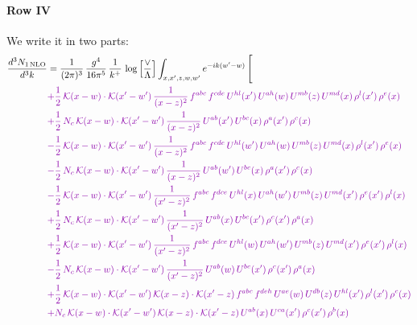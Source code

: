 \documentclass[10pt]{article}
\numberwithin{equation}{section}
\begin{document}
\paragraph{Row IV}
We write it in two parts: 
\begin{align}
\frac{d^{3}N_{1\,\mathrm{NLO}}}{d^{3}k} & = \frac{1}{(2\pi)^{3}}\,\frac{g^{4}}{16\pi^{5}}\,\frac{1}{k^{+}}\,\log\Big[\frac{\vee}{\Lambda}\Big]\int_{x,x',z,w,w'}e^{-ik(w'-w)}\,\Bigg[\notag\\ &{\color{CC} 
 +\frac{1}{2}\,\mathcal{K}(x-w)\cdot\mathcal{K}(x'-w')\,\frac{1}{(x-z)^{2}}\,f^{abc}\,f^{cde}\,U^{hl}(x')\,U^{ah}(w)\,U^{mb}(z)\,U^{md}(x)\,\rho^{l}(x')\,\rho^{e}(x)} \notag\\
&{\color{CC} +\frac{1}{2}\,N_{c}\,\mathcal{K}(x-w)\cdot\mathcal{K}(x'-w')\,\frac{1}{(x-z)^{2}}\,U^{ab}(x')\,U^{bc}(x)\,\rho^{a}(x')\,\rho^{c}(x)} \notag\\
&{\color{CC} -\frac{1}{2}\,\mathcal{K}(x-w)\cdot\mathcal{K}(x'-w')\,\frac{1}{(x-z)^{2}}\,f^{abc}\,f^{cde}\,U^{hl}(w')\,U^{ah}(w)\,U^{mb}(z)\,U^{md}(x)\,\rho^{l}(x')\,\rho^{e}(x)} \notag\\
&{\color{CC} -\frac{1}{2}\,N_{c}\,\mathcal{K}(x-w)\cdot\mathcal{K}(x'-w')\,\frac{1}{(x-z)^{2}}\,U^{ab}(w')\,U^{bc}(x)\,\rho^{a}(x')\,\rho^{c}(x)} \notag\\
&{\color{CC} -\frac{1}{2}\,\mathcal{K}(x-w)\cdot\mathcal{K}(x'-w')\,\frac{1}{(x'-z)^{2}}\,f^{abc}\,f^{dce}\,U^{hl}(x)\,U^{ah}(w')\,U^{mb}(z)\,U^{md}(x')\,\rho^{e}(x')\,\rho^{l}(x)} \notag\\
&{\color{CC} +\frac{1}{2}\,N_{c}\,\mathcal{K}(x-w)\cdot\mathcal{K}(x'-w')\,\frac{1}{(x'-z)^{2}}\,U^{ab}(x)\,U^{bc}(x')\,\rho^{c}(x')\,\rho^{a}(x)} \notag\\
&{\color{CC} +\frac{1}{2}\,\mathcal{K}(x-w)\cdot\mathcal{K}(x'-w')\,\frac{1}{(x'-z)^{2}}\,f^{abc}\,f^{dce}\,U^{hl}(w)\,U^{ah}(w')\,U^{mb}(z)\,U^{md}(x')\,\rho^{e}(x')\,\rho^{l}(x)} \notag\\
&{\color{CC} -\frac{1}{2}\,N_{c}\,\mathcal{K}(x-w)\cdot\mathcal{K}(x'-w')\,\frac{1}{(x'-z)^{2}}\,U^{ab}(w)\,U^{bc}(x')\,\rho^{c}(x')\,\rho^{a}(x)} \notag\\
&{\color{CC} +\frac{1}{2}\,\mathcal{K}(x-w)\cdot\mathcal{K}(x'-w')\,\mathcal{K}(x-z)\cdot\mathcal{K}(x'-z)\,f^{abc}\,f^{deh}\,U^{ae}(w)\,U^{db}(z)\,U^{hl}(x')\,\rho^{l}(x')\,\rho^{c}(x)} \notag\\
&{\color{CC} +N_{c}\,\mathcal{K}(x-w)\cdot\mathcal{K}(x'-w')\,\mathcal{K}(x-z)\cdot\mathcal{K}(x'-z)\,U^{ab}(x)\,U^{ca}(x')\,\rho^{c}(x')\,\rho^{b}(x)} \notag\\

\end{align}
\end{document}

